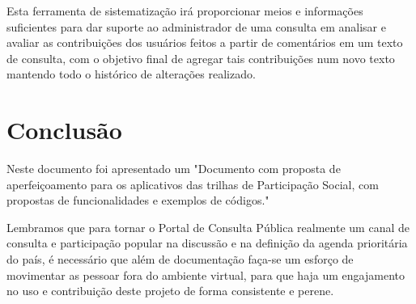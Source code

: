 \documentclass[12pt]{article}
\newcommand{\ProductDescription}{"Documento com proposta de aperfeiçoamento
  para os aplicativos das trilhas de Participação Social, com propostas de
  funcionalidades e exemplos de códigos."
}
\begin{document}
Esta ferramenta de sistematização irá proporcionar meios e informações
suficientes para dar suporte ao administrador de uma consulta em analisar e
avaliar as contribuições dos usuários feitos a partir de comentários em um
texto de consulta, com o objetivo final de agregar tais contribuições num novo
texto mantendo todo o histórico de alterações realizado.

\section{Conclusão}

Neste documento foi apresentado um \ProductDescription

Lembramos que para tornar o Portal de Consulta Pública realmente um canal de
consulta e participação popular na discussão e na definição da agenda
prioritária do país, é necessário que além de documentação faça-se um esforço
de movimentar as pessoar fora do ambiente virtual, para que haja um
engajamento no uso e contribuição deste projeto de forma consistente e perene.

\newpage

\newpage
\listoffigures
\newpage
\printindex
\newpage

\appendix
\appendixpage

\end{document}
